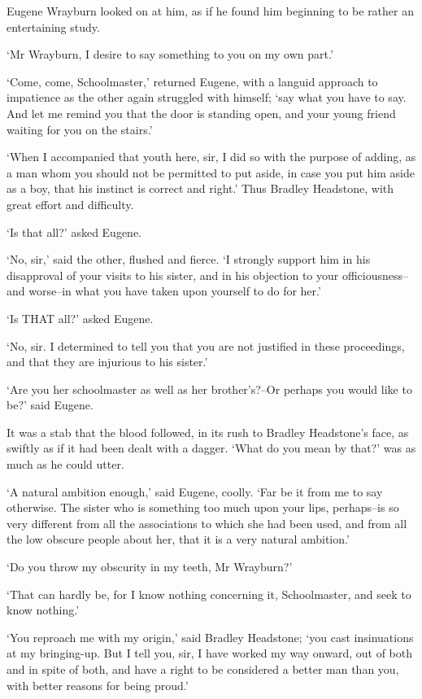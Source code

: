 Eugene Wrayburn looked on at him, as if he found him beginning to be
rather an entertaining study.

‘Mr Wrayburn, I desire to say something to you on my own part.’

‘Come, come, Schoolmaster,’ returned Eugene, with a languid approach to
impatience as the other again struggled with himself; ‘say what you have
to say. And let me remind you that the door is standing open, and your
young friend waiting for you on the stairs.’

‘When I accompanied that youth here, sir, I did so with the purpose of
adding, as a man whom you should not be permitted to put aside, in case
you put him aside as a boy, that his instinct is correct and right.’
Thus Bradley Headstone, with great effort and difficulty.

‘Is that all?’ asked Eugene.

‘No, sir,’ said the other, flushed and fierce. ‘I strongly support him
in his disapproval of your visits to his sister, and in his objection to
your officiousness--and worse--in what you have taken upon yourself to
do for her.’

‘Is THAT all?’ asked Eugene.

‘No, sir. I determined to tell you that you are not justified in these
proceedings, and that they are injurious to his sister.’

‘Are you her schoolmaster as well as her brother’s?--Or perhaps you
would like to be?’ said Eugene.

It was a stab that the blood followed, in its rush to Bradley
Headstone’s face, as swiftly as if it had been dealt with a dagger.
‘What do you mean by that?’ was as much as he could utter.

‘A natural ambition enough,’ said Eugene, coolly. ‘Far be it from me
to say otherwise. The sister who is something too much upon your lips,
perhaps--is so very different from all the associations to which she had
been used, and from all the low obscure people about her, that it is a
very natural ambition.’

‘Do you throw my obscurity in my teeth, Mr Wrayburn?’

‘That can hardly be, for I know nothing concerning it, Schoolmaster, and
seek to know nothing.’

‘You reproach me with my origin,’ said Bradley Headstone; ‘you cast
insinuations at my bringing-up. But I tell you, sir, I have worked my
way onward, out of both and in spite of both, and have a right to be
considered a better man than you, with better reasons for being proud.’


